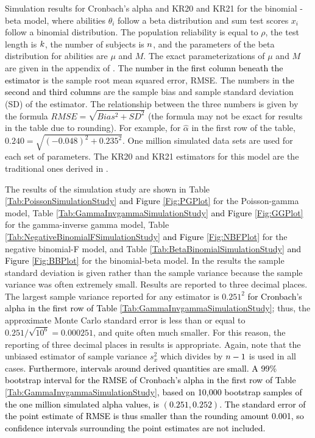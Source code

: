 \documentclass[12pt,epsfig]{article}
\newcommand{\changed}[1]{\textcolor{black}{#1}}
\newcommand{\numsubjects}{\changed{n}}%
\newcommand{\testlength}{\changed{k}}%
\begin{document}
\begin{table}[h]
\caption{Simulation results for Cronbach's alpha and KR20 and KR21 for the binomial - beta model, where abilities $\theta_i$ follow a beta distribution and sum test scores $x_i$ follow a binomial distribution. The population reliability is equal to $\rho$, the test length is $\testlength$, the number of subjects is $\numsubjects$, and the parameters of the beta distribution for abilities are $\mu$ and $M$.  The exact parameterizations of $\mu$ and $M$ are given in the appendix of \cite{Foster2020}. The \changed{number in the first column beneath the estimator} is the sample root mean squared error, RMSE. The numbers in \changed{the second and third columns} are the sample bias and sample standard deviation (SD) of the estimator. The relationship between the three numbers is given by the formula $RMSE = \sqrt{Bias^2 + SD^2}$ (the formula may not be exact for results in the table due to rounding). For example, for $\hat{\alpha}$ in the first row of the table, $0.240 = \sqrt{(-0.048)^2 + 0.235^2}$. One million simulated data sets are used for each set of parameters. The KR20 and KR21 estimators for this model are the traditional ones derived in \cite{Kuder1937}.}
\label{Tab:BetaBinomialSimulationStudy}
\end{table}



The results of the simulation study are shown in Table \ref{Tab:PoissonSimulationStudy} \changed{and Figure \ref{Fig:PGPlot}} for the Poisson-gamma model, Table \ref{Tab:GammaInvgammaSimulationStudy}  \changed{and Figure \ref{Fig:GGPlot}} for the gamma-inverse gamma model, Table \ref{Tab:NegativeBinomialFSimulationStudy}  \changed{and Figure \ref{Fig:NBFPlot}} for the negative binomial-F model, and Table \ref{Tab:BetaBinomialSimulationStudy}  \changed{and Figure \ref{Fig:BBPlot}} for the binomial-beta model. In the results the sample standard deviation is given rather than the sample variance because the sample variance was often extremely small. Results are reported to three decimal places. The largest sample variance reported for any estimator is $0.251^2$ \changed{for Cronbach's alpha in the first row of Table \ref{Tab:GammaInvgammaSimulationStudy}}; thus, the approximate Monte Carlo standard error is less than or equal to $0.251/\sqrt{10^6} = 0.000251$, and quite often  much smaller. For this reason, the reporting of three decimal places in results is appropriate. Again, note that the unbiased estimator of sample variance $s^2_x$ which divides by $\numsubjects - 1$  is used in all cases. \changed{Furthermore, intervals around derived quantities are small. A 99\% bootstrap interval for the RMSE of Cronbach's alpha in the first row of Table \ref{Tab:GammaInvgammaSimulationStudy}, based on 10,000 bootstrap samples of the one million simulated alpha values, is $(0.251, 0.252)$. The standard error of the point estimate of RMSE is thus smaller than the rounding amount 0.001, so  confidence intervals surrounding the point estimates are not included.}
\end{document}
